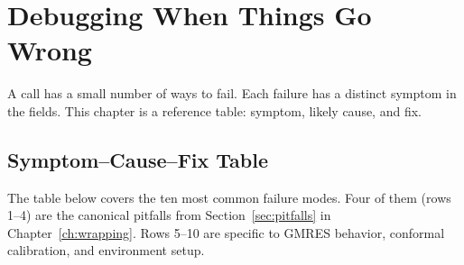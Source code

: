 %
%

\chapter{Debugging When Things Go Wrong}
\label{ch:debug}


A  call has a small number of ways to fail.
Each failure has a distinct symptom in the  fields.
This chapter is a reference table: symptom, likely cause, and fix.

\section{Symptom--Cause--Fix Table}
\label{sec:debug-table}

The table below covers the ten most common failure modes.
Four of them (rows 1--4) are the canonical pitfalls from
Section~\ref{sec:pitfalls} in Chapter~\ref{ch:wrapping}.
Rows 5--10 are specific to GMRES behavior, conformal calibration, and
environment setup.

\medskip

